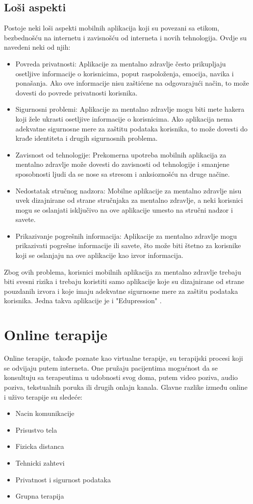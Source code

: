\documentclass[a4paper]{article}
\begin{document}
\subsection{Loši aspekti}
Postoje neki loši aspekti mobilnih aplikacija koji su povezani sa etikom, bezbednošću na internetu i zavisnošću od interneta i novih tehnologija. Ovdje su navedeni neki od njih:
\begin{itemize}
\item Povreda privatnosti: Aplikacije za mentalno zdravlje često prikupljaju osetljive informacije o korisnicima, poput raspoloženja, emocija, navika i ponašanja. Ako ove informacije nisu zaštićene na odgovarajući način, to može dovesti do povrede privatnosti korisnika.
\item Sigurnosni problemi: Aplikacije za mentalno zdravlje mogu biti mete hakera koji žele ukrasti osetljive informacije o korisnicima. Ako aplikacija nema adekvatne sigurnosne mere za zaštitu podataka korisnika, to može dovesti do krađe identiteta i drugih sigurnosnih problema.
\item Zavisnost od tehnologije: Prekomerna upotreba mobilnih aplikacija za mentalno zdravlje može dovesti do zavisnosti od tehnologije i smanjene sposobnosti ljudi da se nose sa stresom i anksioznošću na druge načine.
\item Nedostatak stručnog nadzora: Mobilne aplikacije za mentalno zdravlje nisu uvek dizajnirane od strane stručnjaka za mentalno zdravlje, a neki korisnici mogu se oslanjati isključivo na ove aplikacije umesto na stručni nadzor i savete.
\item Prikazivanje pogrešnih informacija: Aplikacije za mentalno zdravlje mogu prikazivati pogrešne informacije ili savete, što može biti štetno za korisnike koji se oslanjaju na ove aplikacije kao izvor informacija.
\end{itemize}

Zbog ovih problema, korisnici mobilnih aplikacija za mentalno zdravlje trebaju biti svesni rizika i trebaju koristiti samo aplikacije koje su dizajnirane od strane pouzdanih izvora i koje imaju adekvatne sigurnosne mere za zaštitu podataka korisnika. Jedna takva aplikacije je i "Edupression" \cite{sedamnaest}.

\section{Online terapije}
\label{sec:onlajnTerapija}
Online terapije, takođe poznate kao virtualne terapije, su terapijski procesi koji se odvijaju putem interneta. One pružaju pacijentima mogućnost da se konsultuju sa terapeutima u udobnosti svog doma, putem video poziva, audio poziva, tekstualnih poruka ili drugih onlajn kanala. Glavne razlike između online i uživo terapije su sledeće: 
\begin{itemize}
\item Nacin komunikacije
\item Prisustvo tela
\item Fizicka distanca
\item Tehnicki zahtevi
\item Privatnost i sigurnost podataka
\item Grupna terapija
\end{itemize}
\end{document}
